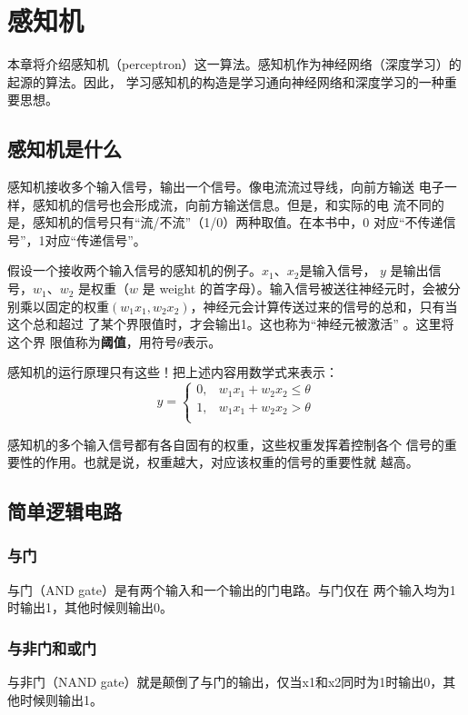 \chapter{感知机}
本章将介绍感知机（perceptron）这一算法。感知机作为神经网络（深度学习）的起源的算法。因此，
学习感知机的构造是学习通向神经网络和深度学习的一种重要思想。
\section{感知机是什么}
感知机接收多个输入信号，输出一个信号。像电流流过导线，向前方输送
电子一样，感知机的信号也会形成流，向前方输送信息。但是，和实际的电
流不同的是，感知机的信号只有“流/不流”（1/0）两种取值。在本书中，0
对应“不传递信号”，1对应“传递信号”。

假设一个接收两个输入信号的感知机的例子。$x_1$、$x_2$是输入信号，
$y$ 是输出信号，$w_1$、$w_2$ 是权重（$w$ 是 weight 的首字母）。输入信号被送往神经元时，会被分别乘以固定的权重$(w_1x_1, w_2x_2)$，神经元会计算传送过来的信号的总和，只有当这个总和超过
了某个界限值时，才会输出1。这也称为“神经元被激活” 。这里将这个界
限值称为\textbf{阈值}，用符号$\theta$表示。

感知机的运行原理只有这些！把上述内容用数学式来表示：
\begin{equation}
    \label{eq2-1}
    y = \left \{
    \begin{array}{ll}
        0, & w_1x_1+w_2x_2  \leq \theta \\
        1, & w_1x_1+w_2x_2 > \theta     \\
    \end{array}
    \right.
\end{equation}

感知机的多个输入信号都有各自固有的权重，这些权重发挥着控制各个
信号的重要性的作用。也就是说，权重越大，对应该权重的信号的重要性就
越高。
\section{简单逻辑电路}
\subsection{与门}
与门（AND gate）是有两个输入和一个输出的门电路。与门仅在
两个输入均为1时输出1，其他时候则输出0。
\subsection{与非门和或门}
与非门（NAND gate）就是颠倒了与门的输出，仅当x1和x2同时为1时输出0，其他时候则输出1。

